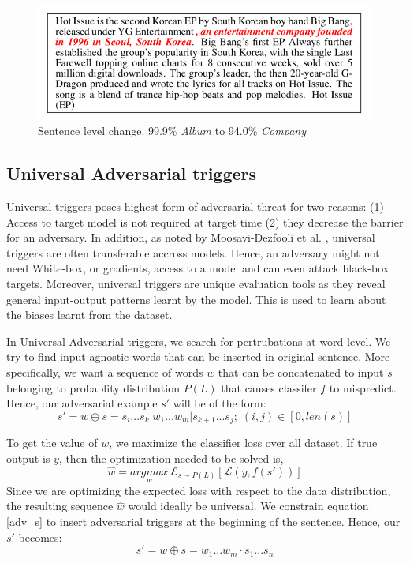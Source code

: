 \documentclass[12pt]{report}
\begin{document}
\begin{spacing}{1.5}
\begin{figure}[!h]
  \centering
  \includegraphics[width=0.8\linewidth]{./img/liang_sen.png}
  \caption{Sentence level change. 99.9\% \textit{Album} to 94.0\% \textit{Company} \cite{liang2018}}
  \label{liang_sen}
\end{figure}

\subsection{Universal Adversarial triggers}
\label{adv_theory}
Universal triggers poses highest form of adversarial threat for two reasons: (1) Access to target model is not required at target time (2) they decrease the barrier for an adversary. In addition, as noted by Moosavi-Dezfooli et al. \cite{moosavi-dezfooli}, universal triggers are often transferable accross models. Hence, an adversary might not need White-box, or gradients, access to a model and can even attack black-box targets.
Moreover, universal triggers are unique evaluation tools as they reveal general input-output patterns learnt by the model. This is used to learn about the biases learnt from the dataset.
\par
In Universal Adversarial triggers, we search for pertrubations at word level.
We try to find input-agnostic words that can be inserted in original sentence.
More specifically, we want a sequence of words $w$ that can be concatenated to input $s$ belonging to probablity distribution $P(L)$ that causes classifer $f$ to mispredict.
Hence, our adversarial example $s'$ will be of the form:
\begin{equation}
  \label{adv_s}
  s' = w \oplus s = s_i...s_k | w_1...w_m | s_{k+1}...s_j; \; (i,j) \in [0, len(s)] 
\end{equation}

To get the value of $w$, we maximize the classifier loss over all dataset. If true output is $y$, then the optimization needed to be solved is,
\begin{equation}
  \label{eq: optim}
  \hat{w} = \underset{w}{argmax} \; \mathcal{E}_{s \sim P(L)}[\mathcal{L}(y, f(s'))]
\end{equation}
Since we are optimizing the expected loss with respect to the
data distribution, the resulting sequence $\hat{w}$ would ideally be
universal. We constrain equation \ref{adv_s} to insert adversarial triggers at the beginning of the sentence. Hence, our $s'$ becomes:
\begin{equation}
  \label{eq: trigger}
  s' = w \oplus s = w_1...w_m \cdot s_1...s_n
\end{equation}


\end{spacing}
\end{document}
